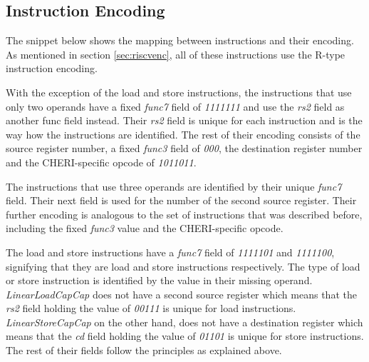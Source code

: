 \subsection{Instruction Encoding}
\label{sec:sailencoding}
The snippet below shows the mapping between instructions and their encoding. As mentioned in section \ref{sec:riscvenc}, all of these instructions use the R-type instruction encoding.

With the exception of the load and store instructions, the instructions that use only two operands have a fixed \textit{func7} field of \textit{1111111} and use the \textit{rs2} field as another func field instead. Their \textit{rs2} field is unique for each instruction and is the way how the instructions are identified. The rest of their encoding consists of the source register number, a fixed \textit{func3} field of \textit{000}, the destination register number and the CHERI-specific opcode of \textit{1011011}.

The instructions that use three operands are identified by their unique \textit{func7} field. Their next field is used for the number of the second source register. Their further encoding is analogous to the set of instructions that was described before, including the fixed \textit{func3} value and the CHERI-specific opcode.

The load and store instructions have a \textit{func7} field of \textit{1111101} and \textit{1111100}, signifying that they are load and store instructions respectively. The type of load or store instruction is identified by the value in their missing operand. \textit{LinearLoadCapCap} does not have a second source register which means that the \textit{rs2} field holding the value of \textit{00111} is unique for load instructions. \textit{LinearStoreCapCap} on the other hand, does not have a destination register which means that the \textit{cd} field holding the value of \textit{01101} is unique for store instructions. The rest of their fields follow the principles as explained above.

